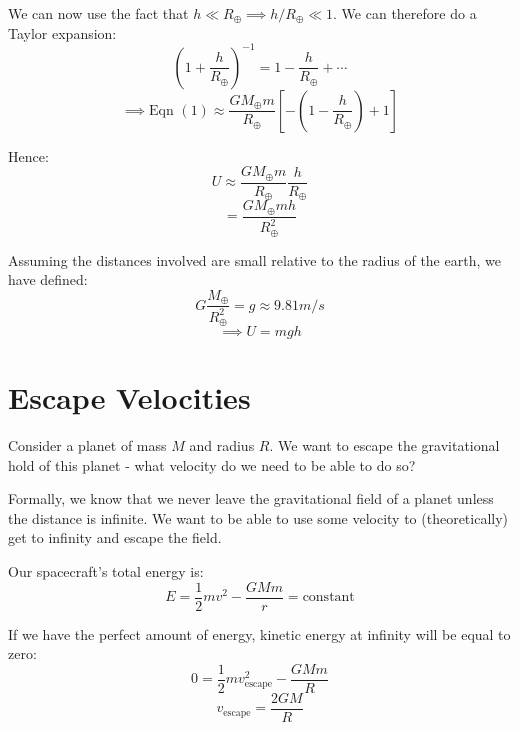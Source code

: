 We can now use the fact that $h \ll R_\oplus \implies h/R_\oplus \ll 1$. We can therefore do a Taylor expansion:
\[
    \left(1 + \frac{h}{R_\oplus}\right)^{-1} = 1 - \frac{h}{R_\oplus} + \cdots
\]
\[
    \implies \text{Eqn }(1) \approx \frac{G M_\oplus m}{R_\oplus} \left[- \left(1 - \frac{h}{R_\oplus}\right)+ 1\right]
\]

Hence:
\[
    U \approx \frac{GM_\oplus m}{R_\oplus} \frac{h}{R_\oplus}
\]
\[
    = \frac{GM_\oplus m h}{R_\oplus^2}
\]

Assuming the distances involved are small relative to the radius of the earth, we have defined:
\[
    G \frac{M_\oplus}{R_\oplus^2} = g \approx 9.81 \si{m/s}
\]
\[
    \implies U = mgh
\]

\section{Escape Velocities}
Consider a planet of mass $M$ and radius $R$. We want to escape the gravitational hold of this planet - what velocity do we need to be able to do so?

Formally, we know that we never leave the gravitational field of a planet unless the distance is infinite. We want to be able to use some velocity to (theoretically) get to infinity and escape the field.

Our spacecraft's total energy is:
\[
    E = \frac{1}{2}mv^2 - \frac{GMm}{r} = \text{constant}
\]

If we have the perfect amount of energy, kinetic energy at infinity will be equal to zero:
\[
    0 = \frac{1}{2}m v_\text{escape}^2 - \frac{GMm}{R}
\]
\[
    v_\text{escape} = \frac{2GM}{R}
\]



